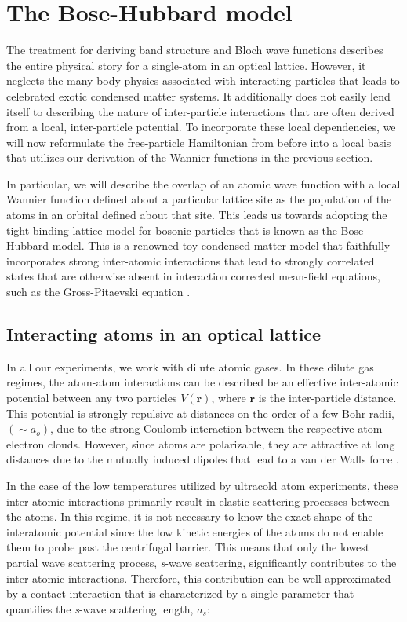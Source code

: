 \section{The Bose-Hubbard model}

The treatment for deriving band structure and Bloch wave functions describes the entire physical story for a single-atom in an optical lattice. However, it neglects the many-body physics associated with interacting particles that leads to celebrated exotic condensed matter systems. It additionally does not easily lend itself to describing the nature of inter-particle interactions that are often derived from a local, inter-particle potential. To incorporate these local dependencies, we will now reformulate the free-particle Hamiltonian from before into a local basis that utilizes our derivation of the Wannier functions in the previous section.

In particular, we will describe the overlap of an atomic wave function with a local Wannier function defined about a particular lattice site as the population of the atoms in an orbital defined about that site. This leads us towards adopting the tight-binding lattice model for bosonic particles that is known as the Bose-Hubbard model. This is a renowned toy condensed matter model that faithfully incorporates strong inter-atomic interactions that lead to strongly correlated states that are otherwise absent in interaction corrected mean-field equations, such as the Gross-Pitaevski equation \cite{Preiss2015, Jaksch1998}. 

\subsection{Interacting atoms in an optical lattice}

In all our experiments, we work with dilute atomic gases. In these dilute gas regimes, the atom-atom interactions can be described be an effective inter-atomic potential between any two particles $V(\textbf{r})$, where $\textbf{r}$ is the inter-particle distance. This potential is strongly repulsive at distances on the order of a few Bohr radii, $(\sim a_o)$, due to the strong Coulomb interaction between the respective atom electron clouds. However, since atoms are polarizable, they are attractive at long distances due to the mutually induced dipoles that lead to a van der Walls force \cite{Weiner1999}. 

In the case of the low temperatures utilized by ultracold atom experiments, these inter-atomic interactions primarily result in elastic scattering processes between the atoms. In this regime, it is not necessary to know the exact shape of the interatomic potential since the low kinetic energies of the atoms do not enable them to probe past the centrifugal barrier. This means that only the lowest partial wave scattering process, \emph{s}-wave scattering, significantly contributes to the inter-atomic interactions. Therefore, this contribution can be well approximated by a contact interaction that is characterized by a single parameter that quantifies the \emph{s}-wave scattering length, $a_s$: 

